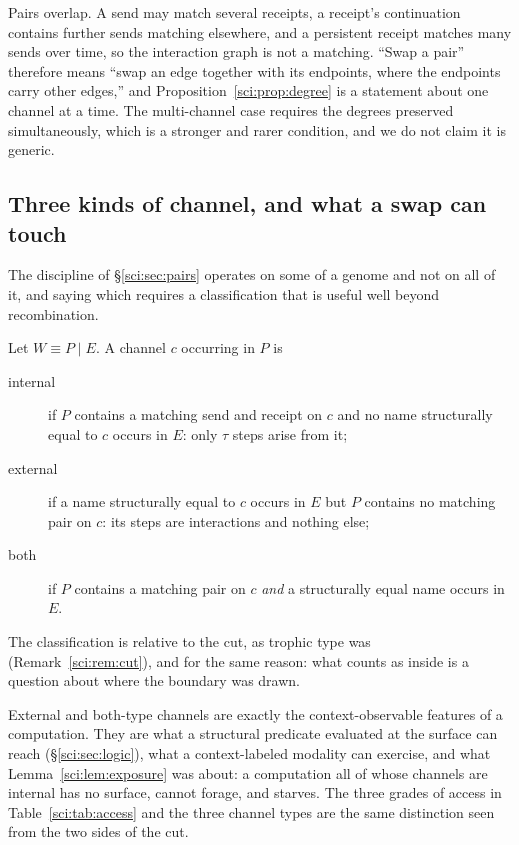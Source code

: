 \begin{remark}
\label{sci:rem:overlap}
Pairs overlap. A send may match several receipts, a receipt's continuation contains further sends
matching elsewhere, and a persistent receipt matches many sends over time, so the interaction graph is
not a matching. ``Swap a pair'' therefore means ``swap an edge together with its endpoints, where the
endpoints carry other edges,'' and Proposition~\ref{sci:prop:degree} is a statement about one channel at a
time. The multi-channel case requires the degrees preserved simultaneously, which is a stronger and
rarer condition, and we do not claim it is generic.
\end{remark}

\subsection{Three kinds of channel, and what a swap can touch}\label{sci:S12.6}
\label{sci:sec:chantypes}

The discipline of \S\ref{sci:sec:pairs} operates on some of a genome and not on all of it, and saying
which requires a classification that is useful well beyond recombination.

\begin{definition}
\label{sci:def:chantypes}
Let $W \equiv P \mid E$. A channel $c$ occurring in $P$ is
\begin{description}
\item[internal] if $P$ contains a matching send and receipt on $c$ and no name structurally equal to
$c$ occurs in $E$: only $\tau$ steps arise from it;
\item[external] if a name structurally equal to $c$ occurs in $E$ but $P$ contains no matching pair on
$c$: its steps are interactions and nothing else;
\item[both] if $P$ contains a matching pair on $c$ \emph{and} a structurally equal name occurs in $E$.
\end{description}
\end{definition}

The classification is relative to the cut, as trophic type was (Remark~\ref{sci:rem:cut}), and for the
same reason: what counts as inside is a question about where the boundary was drawn.

\begin{remark}
\label{sci:rem:surfacesyntax}
External and both-type channels are exactly the context-observable features of a computation. They
are what a structural predicate evaluated at the surface can reach (\S\ref{sci:sec:logic}), what a
context-labeled modality can exercise, and what Lemma~\ref{sci:lem:exposure} was about: a computation all
of whose channels are internal has no surface, cannot forage, and starves. The three grades of access
in Table~\ref{sci:tab:access} and the three channel types are the same distinction seen from the two sides
of the cut.
\end{remark}

